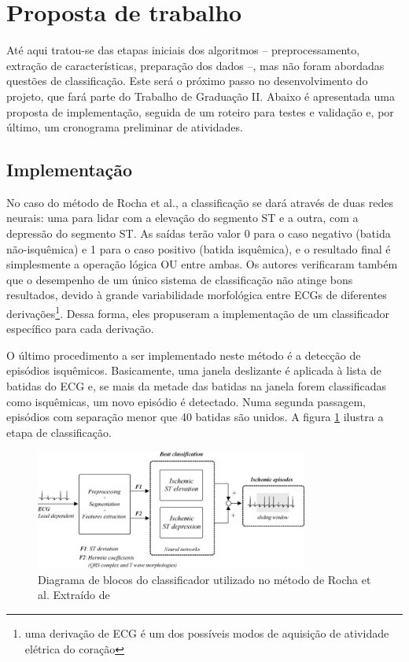 
\section{Proposta de trabalho}
\label{sec:section5}

Até aqui tratou-se das etapas iniciais dos algoritmos -- preprocessamento, extração de características, preparação dos dados --, mas não foram abordadas questões de classificação. Este será o próximo passo no desenvolvimento do projeto, que fará parte do Trabalho de Graduação II. Abaixo é apresentada uma proposta de implementação, seguida de um roteiro para testes e validação e, por último, um cronograma preliminar de atividades.

\subsection{Implementação}
No caso do método de Rocha et al., a classificação se dará através de duas redes neurais: uma para lidar com a elevação do segmento ST e a outra, com a depressão do segmento ST. As saídas terão valor 0 para o caso negativo (batida não-isquêmica) e 1 para o caso positivo (batida isquêmica), e o resultado final é simplesmente a operação lógica OU entre ambas. Os autores verificaram também que o desempenho de um único sistema de classificação não atinge bons resultados, devido à grande variabilidade morfológica entre ECGs de diferentes derivações\footnote{uma derivação de ECG é um dos possíveis modos de aquisição de atividade elétrica do coração}. Dessa forma, eles propuseram a implementação de um classificador específico para cada derivação.

O último procedimento a ser implementado neste método é a detecção de episódios isquêmicos. Basicamente, uma janela deslizante é aplicada à lista de batidas do ECG e, se mais da metade das batidas na janela  forem classificadas como isquêmicas, um novo episódio é detectado. Numa segunda passagem, episódios com separação menor que 40 batidas são unidos. A figura \ref{fig:rocha_03} ilustra a etapa de classificação.

\begin{figure}[ht]
    \centering
    \includegraphics[width=0.8\textwidth]{figures/rocha_03.png}
    \caption{Diagrama de blocos do classificador utilizado no método de Rocha et al. Extraído de \cite{Rocha10}}
    \label{fig:rocha_03}
\end{figure}

